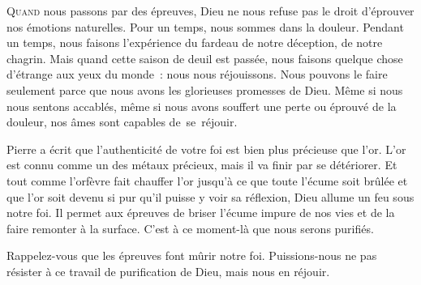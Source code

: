 
\lettrine{Q}{uand} nous passons par des épreuves, Dieu ne nous refuse pas
 le droit d'éprouver nos émotions naturelles. Pour un temps, nous sommes
 dans la douleur. Pendant un temps, nous faisons l'expérience du fardeau
 de notre déception, de notre chagrin. Mais quand cette saison de deuil
 est passée, nous faisons quelque chose d'étrange aux yeux du monde~:
 nous nous réjouissons.
 Nous pouvons le faire seulement parce que nous avons les glorieuses
 promesses de Dieu. Même si nous nous sentons accablés,
 même si nous avons souffert une perte ou éprouvé de la douleur,
 nos âmes sont capables de~se~réjouir.


Pierre a écrit que l'authenticité de votre foi est bien plus précieuse que l'or.
 L'or est connu comme un des métaux précieux, mais il va finir par se détériorer.
 Et tout comme l'orfèvre fait chauffer l'or jusqu'à ce que toute l'écume
 soit brûlée et que l'or soit devenu si pur qu'il puisse y voir sa réflexion,
 Dieu allume un feu sous notre foi. Il permet aux épreuves de briser l'écume
 impure de nos vies et de la faire remonter à la surface.
 C'est à ce moment-là que nous serons purifiés.

Rappelez-vous que les épreuves font mûrir notre foi.
 Puissions-nous ne pas résister à ce travail de purification de Dieu,
 mais nous en réjouir.

\dvrule






